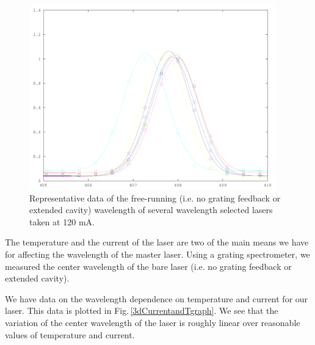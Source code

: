 \begin{figure}
\centering
\includegraphics[width=0.95\textwidth]{wavelength_selected} 
\caption[Wavelength of different laser diodes]{\label{wavelengthselected} Representative data of the free-running (i.e. no grating feedback or extended cavity) wavelength of several wavelength selected lasers taken at 120 mA.} %
\end{figure}


The temperature and the current of the laser are two of the main means we have for affecting the wavelength of the master laser. Using a grating spectrometer, we measured the center wavelength of the bare laser (i.e. no grating feedback or extended cavity).


We have data on the wavelength dependence on temperature and current for our laser. This data is plotted in Fig.\,\ref{3dCurrentandTgraph}. We see that the variation of the center wavelength of the laser is roughly linear over reasonable values of temperature and current.



